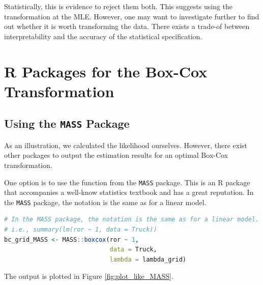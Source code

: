 \documentclass[11pt]{book}
\begin{document}
Statistically, this is evidence to reject them both.
This suggests using the transformation at the MLE.
However, one may want to investigate further 
to find out whether it is worth 
transforming the data. 
There exists a trade-of between interpretability and 
the accuracy of the statistical specification. 


\clearpage
\section{\textsf{R} Packages for the Box-Cox Transformation}
\subsection*{Using the \texttt{MASS} Package}

As an illustration, we calculated
the likelihood ourselves.
However, there exist other packages
to output the estimation results for
an optimal Box-Cox transformation.

One option is to use the function from the \texttt{MASS} package.
This is an \textsf{R} package that accompanies a well-know statistics textbook
and has a great reputation. 
In the \texttt{MASS} package, the notation is the same as for a linear model.


\begin{lstlisting}[language=R]
# In the MASS package, the notation is the same as for a linear model.
# i.e., summary(lm(ror ~ 1, data = Truck))
bc_grid_MASS <- MASS::boxcox(ror ~ 1,
                             data = Truck,
                             lambda = lambda_grid)
\end{lstlisting}

The output is plotted in Figure \ref{fig:plot_like_MASS}.
\end{document}
